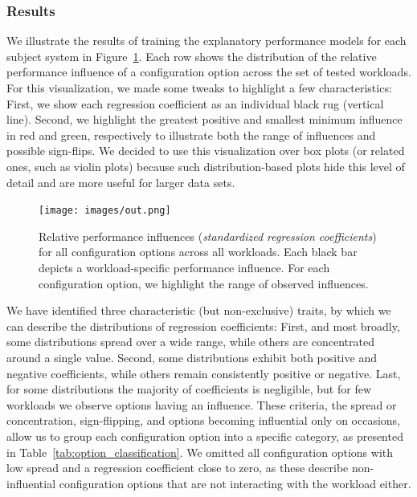 {\subsubsection{Results}
We illustrate the results of training the explanatory performance models for each subject system in Figure~\ref{fig:results_influence}. Each row shows the distribution of the relative performance influence of a configuration option across the set of tested workloads. For this visualization, we made some tweaks to highlight a few characteristics: First, we show each regression coefficient as an individual black rug (vertical line). Second, we highlight the greatest positive and smallest minimum influence in red and green, respectively to illustrate both the range of influences and possible sign-flips. 
{\color{green!50!black}We decided to use this visualization over box plots (or related ones, such as violin plots) because such distribution-based plots hide this level of detail and are more useful for larger data sets.}\\
\begin{figure}
	\centering
	\texttt{[image: images/out.png]}
	\caption{Relative performance influences (\textit{standardized regression coefficients}) for all configuration options across all workloads. Each black bar depicts a workload-specific performance influence. For each configuration option, we highlight the range of observed influences.}
	\label{fig:results_influence}
\end{figure}
We have identified three characteristic (but non-exclusive) traits, by which we can describe the distributions of regression coefficients: First, and most broadly, some distributions spread over a wide range, while others are concentrated around a single value. Second, some distributions exhibit both positive and negative coefficients, while others remain consistently positive or negative. Last, for some distributions the majority of coefficients is negligible, but for few workloads we observe options having an influence. These criteria, the spread or concentration, sign-flipping, and options becoming influential only on occasions, allow us to group each configuration option into a specific category, as presented in Table~\ref{tab:option_classification}. We omitted all configuration options with low spread and a regression coefficient close to zero, as these describe non-influential configuration options that are not interacting with the workload either. 

}
